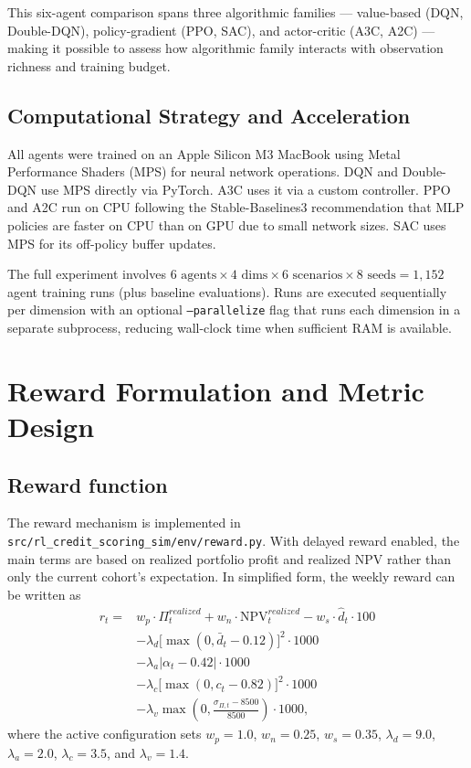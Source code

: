 \documentclass[12pt,a4paper]{article}
\begin{document}
This six-agent comparison spans three algorithmic families --- value-based (DQN, Double-DQN), policy-gradient (PPO, SAC), and actor-critic (A3C, A2C) --- making it possible to assess how algorithmic family interacts with observation richness and training budget.

\subsection{Computational Strategy and Acceleration}

All agents were trained on an Apple Silicon M3 MacBook using Metal Performance
Shaders (MPS) for neural network operations. DQN and Double-DQN use MPS directly
via PyTorch. A3C uses it via a custom controller. PPO and A2C run on CPU following
the Stable-Baselines3 recommendation that MLP policies are faster on CPU than on
GPU due to small network sizes. SAC uses MPS for its off-policy buffer updates.

The full experiment involves $6 \text{ agents} \times 4 \text{ dims} \times 6
    \text{ scenarios} \times 8 \text{ seeds} = 1{,}152$ agent training runs (plus
baseline evaluations). Runs are executed sequentially per dimension with an optional
\texttt{--parallelize} flag that runs each dimension in a separate subprocess,
reducing wall-clock time when sufficient RAM is available.

\section{Reward Formulation and Metric Design}

\subsection{Reward function}

The reward mechanism is implemented in \texttt{src/rl\_credit\_scoring\_sim/env/reward.py}. With delayed reward enabled, the main terms are based on realized portfolio profit and realized NPV rather than only the current cohort's expectation. In simplified form, the weekly reward can be written as
\begin{equation}
    \label{eq:reward}
    \begin{aligned}
        r_t ={} & w_p \cdot \Pi^{realized}_t + w_n \cdot \mathrm{NPV}^{realized}_t - w_s \cdot \hat d_t \cdot 100 \\
                & - \lambda_d \bigl[\max(0, \bar d_t - 0.12)\bigr]^2 \cdot 1000                                   \\
                & - \lambda_a \left|\alpha_t - 0.42\right| \cdot 1000                                             \\
                & - \lambda_c \bigl[\max(0, c_t - 0.82)\bigr]^2 \cdot 1000                                        \\
                & - \lambda_v \max\!\left(0, \frac{\sigma_{\Pi,t} - 8500}{8500}\right) \cdot 1000,
    \end{aligned}
\end{equation}
where the active configuration sets $w_p = 1.0$, $w_n = 0.25$, $w_s = 0.35$, $\lambda_d = 9.0$, $\lambda_a = 2.0$, $\lambda_c = 3.5$, and $\lambda_v = 1.4$.
\end{document}
